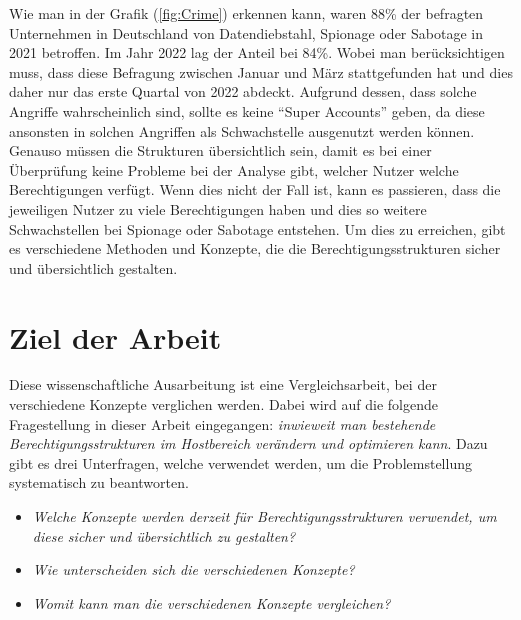 Wie man in der Grafik (\ref{fig:Crime}) erkennen kann, waren 88\% der befragten Unternehmen in Deutschland von Datendiebstahl, Spionage oder Sabotage in 2021 betroffen.
Im Jahr 2022 lag der Anteil bei 84\%.
Wobei man berücksichtigen muss, dass diese Befragung zwischen Januar und März stattgefunden hat und dies daher nur das erste Quartal von 2022 abdeckt.
Aufgrund dessen, dass solche Angriffe wahrscheinlich sind, sollte es keine "`Super Accounts"' geben, da diese ansonsten in solchen Angriffen als Schwachstelle ausgenutzt werden können.
Genauso müssen die Strukturen übersichtlich sein, damit es bei einer Überprüfung keine Probleme bei der Analyse gibt, welcher Nutzer welche Berechtigungen verfügt.
Wenn dies nicht der Fall ist, kann es passieren, dass die jeweiligen Nutzer zu viele Berechtigungen haben und dies so weitere Schwachstellen bei Spionage oder Sabotage entstehen.
Um dies zu erreichen, gibt es verschiedene Methoden und Konzepte, die die Berechtigungsstrukturen sicher und übersichtlich gestalten.

%
%
\section{Ziel der Arbeit}
\label{sec:intro:goal}
Diese wissenschaftliche Ausarbeitung ist eine Vergleichsarbeit, bei der verschiedene Konzepte verglichen werden.
Dabei wird auf die folgende Fragestellung in dieser Arbeit eingegangen: \textit{inwieweit man bestehende Berechtigungsstrukturen im Hostbereich verändern und optimieren kann}.
Dazu gibt es drei Unterfragen, welche verwendet werden, um die Problemstellung systematisch zu beantworten.

\begin{itemize}
  \item \textit{Welche Konzepte werden derzeit für Berechtigungsstrukturen verwendet, um diese sicher und übersichtlich zu gestalten?}
  \item \textit{Wie unterscheiden sich die verschiedenen Konzepte?}
  \item \textit{Womit kann man die verschiedenen Konzepte vergleichen?}
\end{itemize}

